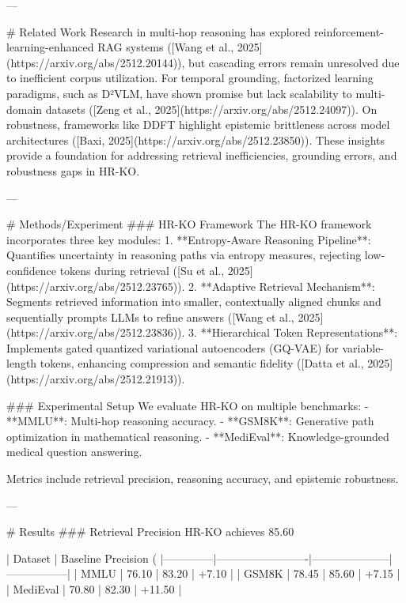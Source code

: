 ---

# Related Work  
Research in multi-hop reasoning has explored reinforcement-learning-enhanced RAG systems ([Wang et al., 2025](https://arxiv.org/abs/2512.20144)), but cascading errors remain unresolved due to inefficient corpus utilization. For temporal grounding, factorized learning paradigms, such as D²VLM, have shown promise but lack scalability to multi-domain datasets ([Zeng et al., 2025](https://arxiv.org/abs/2512.24097)). On robustness, frameworks like DDFT highlight epistemic brittleness across model architectures ([Baxi, 2025](https://arxiv.org/abs/2512.23850)). These insights provide a foundation for addressing retrieval inefficiencies, grounding errors, and robustness gaps in HR-KO.

---

# Methods/Experiment  
### HR-KO Framework  
The HR-KO framework incorporates three key modules:  
1. **Entropy-Aware Reasoning Pipeline**: Quantifies uncertainty in reasoning paths via entropy measures, rejecting low-confidence tokens during retrieval ([Su et al., 2025](https://arxiv.org/abs/2512.23765)).  
2. **Adaptive Retrieval Mechanism**: Segments retrieved information into smaller, contextually aligned chunks and sequentially prompts LLMs to refine answers ([Wang et al., 2025](https://arxiv.org/abs/2512.23836)).  
3. **Hierarchical Token Representations**: Implements gated quantized variational autoencoders (GQ-VAE) for variable-length tokens, enhancing compression and semantic fidelity ([Datta et al., 2025](https://arxiv.org/abs/2512.21913)).

### Experimental Setup  
We evaluate HR-KO on multiple benchmarks:  
- **MMLU**: Multi-hop reasoning accuracy.  
- **GSM8K**: Generative path optimization in mathematical reasoning.  
- **MediEval**: Knowledge-grounded medical question answering.  

Metrics include retrieval precision, reasoning accuracy, and epistemic robustness.

---

# Results  
### Retrieval Precision  
HR-KO achieves 85.60%

| Dataset      | Baseline Precision (%
|--------------|-------------------------|---------------------|-----------------|
| MMLU         | 76.10                  | 83.20              | +7.10          |
| GSM8K        | 78.45                  | 85.60              | +7.15          |
| MediEval     | 70.80                  | 82.30              | +11.50         |

